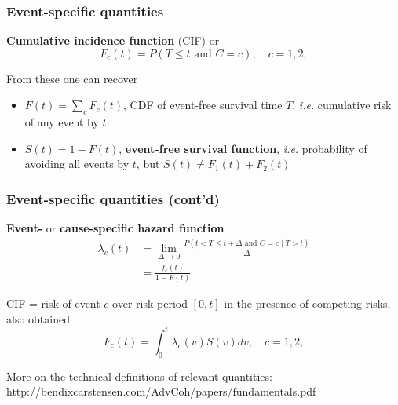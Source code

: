 \documentclass[handout,12pt,dvipsnames,t]{beamer}
\begin{document}
\begin{frame}[fragile]
\frametitle{Event-specific quantities}

\textbf{Cumulative incidence function} (CIF) or \\
\[  F_c(t) = P(T \leq t \text{ and } C = c ), \quad c = 1,2,  \]

\medskip
From these one can recover
\begin{itemize}
\item
$F(t) = \sum_{c} F_c(t)$, CDF of event-free survival time $T$, \textit{i.e.} 
cumulative risk of any event by $t$.
\medskip
\item
$S(t) = 1 - F(t)$, \textbf{event-free survival function}, \textit{i.e.} probability of avoiding all events by $t$, but $S(t) \ne F_1(t)+F_2(t)$
\end{itemize}
\end{frame}


\begin{frame}[fragile]
\frametitle{Event-specific quantities (cont'd)}

\textbf{Event-} or \textbf{cause-specific hazard function}
\begin{align*}
 \lambda_c(t) & =  \underset{\Delta\to 0}{\lim} 
    \frac{P(t < T \le t+\Delta \text{ and } C = c \mid T > t)}{\Delta}  \\
        & =  \frac{f_c(t)}{1-F(t)}
\end{align*}

CIF   =  risk of event $c$ over risk period $[0,t]$ in the presence of competing risks, also obtained 
$$ F_c(t) = \int_0^t \lambda_c(v) S(v) dv, \quad c = 1,2, $$

More on the technical definitions of relevant quantities:
http://bendixcarstensen.com/AdvCoh/papers/fundamentals.pdf

\end{frame}
\end{document}
